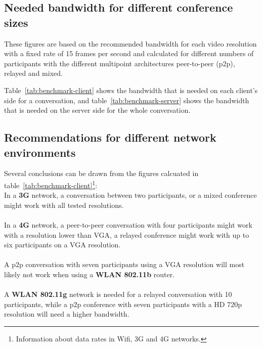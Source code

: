 \documentclass[../../../thesis.tex]{subfiles}
\begin{document}

\subsection{Needed bandwidth for different conference sizes}
These figures are based on the recommended bandwidth for each video resolution with a fixed rate of 15 frames per second and calculated for different numbers of participants with the different multipoint architectures peer-to-peer (p2p), relayed and mixed.\par
Table~\ref{tab:benchmark-client} shows the bandwidth that is needed on each client's side for a conversation, and table~\ref{tab:benchmark-server} shows the bandwidth that is needed on the server side for the whole conversation.



\clearpage
\subsection{Recommendations for different network environments}
Several conclusions can be drawn from the figures calcuated in table~\ref{tab:benchmark-client}\footnote{Information about data rates in Wifi\cite[chapter5-7]{Grigorik.2013}, 3G\cite{wiki-3g} and 4G\cite{wiki-4g} networks.}:\\

In a \textbf{3G} network, a conversation between two participants, or a mixed conference might work with all tested resolutions.\\\\
In a \textbf{4G} network, a peer-to-peer conversation with four participants might work with a resolution lower than VGA, a relayed conference might work with up to six participants on a VGA resolution.\\\\
A p2p conversation with seven participants using a VGA resolution will most likely not work when using a \textbf{WLAN 802.11b} router.\\\\
A \textbf{WLAN 802.11g} network is needed for a relayed conversation with 10 participants, while a p2p conference with seven participants with a HD 720p resolution will need a higher bandwidth.


\end{document}
